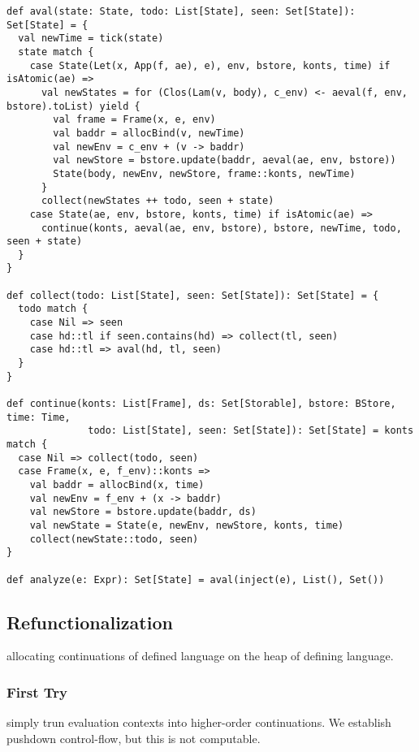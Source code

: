 \documentclass[acmsmall,review,anonymous]{acmart}\settopmatter{printfolios=true,printccs=false,printacmref=false}
\begin{document}
\begin{lstlisting}
def aval(state: State, todo: List[State], seen: Set[State]): Set[State] = { 
  val newTime = tick(state)
  state match {
    case State(Let(x, App(f, ae), e), env, bstore, konts, time) if isAtomic(ae) =>
      val newStates = for (Clos(Lam(v, body), c_env) <- aeval(f, env, bstore).toList) yield {
        val frame = Frame(x, e, env)
        val baddr = allocBind(v, newTime)
        val newEnv = c_env + (v -> baddr)
        val newStore = bstore.update(baddr, aeval(ae, env, bstore))
        State(body, newEnv, newStore, frame::konts, newTime)
      }   
      collect(newStates ++ todo, seen + state)
    case State(ae, env, bstore, konts, time) if isAtomic(ae) =>
      continue(konts, aeval(ae, env, bstore), bstore, newTime, todo, seen + state)
  }   
}

def collect(todo: List[State], seen: Set[State]): Set[State] = { 
  todo match {
    case Nil => seen
    case hd::tl if seen.contains(hd) => collect(tl, seen)
    case hd::tl => aval(hd, tl, seen)
  }   
}

def continue(konts: List[Frame], ds: Set[Storable], bstore: BStore, time: Time,
              todo: List[State], seen: Set[State]): Set[State] = konts match {
  case Nil => collect(todo, seen)
  case Frame(x, e, f_env)::konts =>
    val baddr = allocBind(x, time)
    val newEnv = f_env + (x -> baddr)
    val newStore = bstore.update(baddr, ds) 
    val newState = State(e, newEnv, newStore, konts, time)
    collect(newState::todo, seen)
}

def analyze(e: Expr): Set[State] = aval(inject(e), List(), Set()) 
\end{lstlisting}

\subsection{Refunctionalization}

allocating continuations of defined language on the heap of defining language.

\subsubsection{First Try}

simply trun evaluation contexts into higher-order continuations.
We establish pushdown control-flow, but this is not computable.
\end{document}
